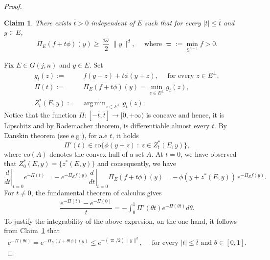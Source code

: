 \documentclass[11pt]{article}
\newtheorem{claim}[theorem]{Claim}
\theoremstyle{definition}
\numberwithin{equation}{section}
\newcommand{\Gr}[2]{G(#1,#2)}        %
\DeclareMathOperator{\argmin}{arg\,min}
\begin{document}
\begin{proof}
\begin{claim}\label{claim.gateaux-bound-Pi}
    There exists $\bar t > 0$ independent of $E$ such that for every $|t| \leq \bar t$ and $y \in E$,
    \begin{align*}
        \Pi_E(f + t \phi)(y) \geq \dfrac{\varpi}{2} \| y \|^d, \quad \text{ where } \varpi := \min_{\mathbb S^{n - 1}} f > 0.
    \end{align*}
\end{claim}



Fix $E \in \Gr{j}{n}$ and $y \in E$.
Set 
\begin{align*}
    g_t(z) := & ~ f(y + z) + t \phi(y + z), \quad \text{ for every } z \in E^\perp, \\
    \Pi(t) := & ~ \Pi_E(f + t\phi)(y) = \min_{z \in E^\perp} g_t(z), \\
    Z^\ast_t(E, y) := & \argmin_{z \in E^\perp} g_t(z).
\end{align*}
Notice that the function $\Pi: [-\bar t, \bar t] \to [0, + \infty)$ is  concave and hence, it is Lipschitz and by Rademacher theorem, is differentiable almost every $t$.
By Danskin theorem (see e.g \cite[Theorem 4.13]{BonnansShapiro2000}), for a.e $t$, it holds
\begin{equation}\label{Pi-prime}
    \Pi'(t) \in \mathrm{co} \big\{  \phi(y + z) ~:~ z \in Z_t^\ast(E, y) \big\},
\end{equation}
where $\mathrm{co}(A)$ denotes the convex hull of a set $A$.
At $t = 0$, we have observed that $Z_0^\ast(E, y) = \{ z^\ast(E, y) \}$ and consequently, we have
\begin{equation}\label{deriv-Pi(t)}
\left. \frac{d}{d t} \right|_{t = 0} e^{-\Pi(t)}
= - \ e^{-\Pi_E f(y)} \left. \frac{d}{d t} \right|_{t = 0}\Pi_E (f+ t\phi)(y)
= -\,\phi(y+z^\ast(E, y))\,e^{-\Pi_E f(y)}.
\end{equation}
For $t \neq 0$, the fundamental theorem of calculus gives
\begin{align*}
    \dfrac{e^{-\Pi(t)} - e^{-\Pi(0)}}{t} = - \int_0^1 \Pi'(\theta t) e^{- \Pi(\theta t)} d\theta.
\end{align*}
To justify the integrability of the above expresion, on the one hand, it follows from Claim~\ref{claim.gateaux-bound-Pi} that
\begin{align*}
    e^{- \Pi(\theta t)} = e^{- \Pi_E(f + \theta t \phi)(y)} \leq e^{- (\varpi/2) \| y \|^d}, \quad \text{ for every } |t| \leq \bar t \text{ and  } \theta \in [0, 1]. 
\end{align*}

\end{proof}
\end{document}
